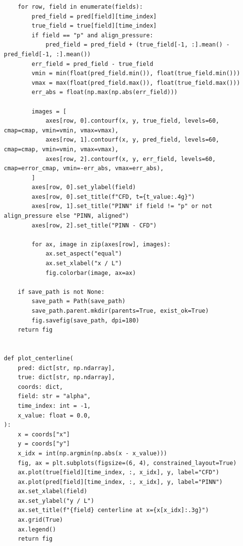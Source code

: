 \begin{lstlisting}
    for row, field in enumerate(fields):
        pred_field = pred[field][time_index]
        true_field = true[field][time_index]
        if field == "p" and align_pressure:
            pred_field = pred_field + (true_field[-1, :].mean() - pred_field[-1, :].mean())
        err_field = pred_field - true_field
        vmin = min(float(pred_field.min()), float(true_field.min()))
        vmax = max(float(pred_field.max()), float(true_field.max()))
        err_abs = float(np.max(np.abs(err_field)))

        images = [
            axes[row, 0].contourf(x, y, true_field, levels=60, cmap=cmap, vmin=vmin, vmax=vmax),
            axes[row, 1].contourf(x, y, pred_field, levels=60, cmap=cmap, vmin=vmin, vmax=vmax),
            axes[row, 2].contourf(x, y, err_field, levels=60, cmap=error_cmap, vmin=-err_abs, vmax=err_abs),
        ]
        axes[row, 0].set_ylabel(field)
        axes[row, 0].set_title(f"CFD, t={t_value:.4g}")
        axes[row, 1].set_title("PINN" if field != "p" or not align_pressure else "PINN, aligned")
        axes[row, 2].set_title("PINN - CFD")

        for ax, image in zip(axes[row], images):
            ax.set_aspect("equal")
            ax.set_xlabel("x / L")
            fig.colorbar(image, ax=ax)

    if save_path is not None:
        save_path = Path(save_path)
        save_path.parent.mkdir(parents=True, exist_ok=True)
        fig.savefig(save_path, dpi=180)
    return fig


def plot_centerline(
    pred: dict[str, np.ndarray],
    true: dict[str, np.ndarray],
    coords: dict,
    field: str = "alpha",
    time_index: int = -1,
    x_value: float = 0.0,
):
    x = coords["x"]
    y = coords["y"]
    x_idx = int(np.argmin(np.abs(x - x_value)))
    fig, ax = plt.subplots(figsize=(6, 4), constrained_layout=True)
    ax.plot(true[field][time_index, :, x_idx], y, label="CFD")
    ax.plot(pred[field][time_index, :, x_idx], y, label="PINN")
    ax.set_xlabel(field)
    ax.set_ylabel("y / L")
    ax.set_title(f"{field} centerline at x={x[x_idx]:.3g}")
    ax.grid(True)
    ax.legend()
    return fig
\end{lstlisting}
